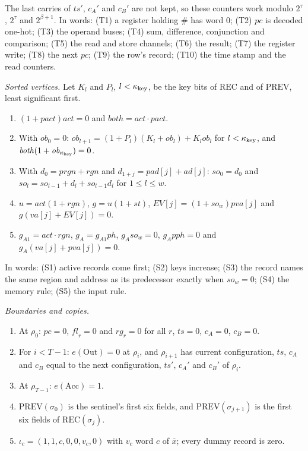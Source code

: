 The last carries of \(\mathit{ts}'\), \(c_A'\) and \(c_B'\) are not
kept, so these counters work modulo \(2^\tau\), \(2^\tau\) and
\(2^{\beta+1}\). In words: (T1) a register holding \(\#\) has word
\(0\); (T2) \(\mathit{pc}\) is decoded one-hot; (T3) the operand buses;
(T4) sum, difference, conjunction and comparison; (T5) the read and
store channels; (T6) the result; (T7) the register write; (T8) the next
\(\mathit{pc}\); (T9) the row's record; (T10) the time stamp and the read
counters.

\emph{Sorted vertices.} Let \(K_l\) and \(P_l\), \(l<\kappa_{\rm key}\), be the key
bits of \(\mathrm{REC}\) and of \(\mathrm{PREV}\), least significant
first.
\begin{enumerate}[label=(S\arabic*)]
\item \((1+\mathit{pact})\mathit{act}=0\) and
\(\mathit{both}=\mathit{act}\cdot\mathit{pact}\).
\item With \(\mathit{ob}_0=0\):
\(\mathit{ob}_{l+1}=(1+P_l)(K_l+\mathit{ob}_l)+K_l\mathit{ob}_l\) for
\(l<\kappa_{\rm key}\), and \(\mathit{both}(1+\mathit{ob}_{\kappa_{\rm key}})=0\).
\item With \(d_0=\mathit{prgn}+\mathit{rgn}\) and
\(d_{1+j}=\mathit{pad}[j]+\mathit{ad}[j]\): \(\mathit{so}_0=d_0\) and
\(\mathit{so}_l=\mathit{so}_{l-1}+d_l+\mathit{so}_{l-1}d_l\) for
\(1\le l\le w\).
\item \(u=\mathit{act}(1+\mathit{rgn})\), \(g=u(1+\mathit{st})\),
\(\mathit{EV}[j]=(1+\mathit{so}_w)\mathit{pva}[j]\) and
\(g(\mathit{va}[j]+\mathit{EV}[j])=0\).
\item \(g_{A1}=\mathit{act}\cdot\mathit{rgn}\),
\(g_A=g_{A1}\mathit{ph}\), \(g_A\mathit{so}_w=0\),
\(g_A\mathit{pph}=0\) and \(g_A(\mathit{va}[j]+\mathit{pva}[j])=0\).
\end{enumerate}
In words: (S1) active records come first; (S2) keys increase; (S3) the
record names the same region and address as its predecessor exactly
when \(\mathit{so}_w=0\); (S4) the memory rule; (S5) the input rule.

\emph{Boundaries and copies.}
\begin{enumerate}[label=(B\arabic*)]
\item At \(\rho_0\): \(\mathit{pc}=0\), \(\mathit{fl}_r=0\) and
\(\mathit{rg}_r=0\) for all \(r\), \(\mathit{ts}=0\), \(c_A=0\),
\(c_B=0\).
\item For \(i<T-1\): \(e(\mathrm{Out})=0\) at \(\rho_i\), and
\(\rho_{i+1}\) has current configuration, \(\mathit{ts}\), \(c_A\) and
\(c_B\) equal to the next configuration, \(\mathit{ts}'\), \(c_A'\)
and \(c_B'\) of \(\rho_i\).
\item At \(\rho_{T-1}\): \(e(\mathrm{Acc})=1\).
\item \(\mathrm{PREV}(\sigma_0)\) is the sentinel's first six fields,
and \(\mathrm{PREV}(\sigma_{j+1})\) is the first six fields of
\(\mathrm{REC}(\sigma_j)\).
\item \(\iota_c=(1,1,c,0,0,v_c,0)\) with \(v_c\) word \(c\) of
\(\bar x\); every dummy record is zero.
\end{enumerate}

